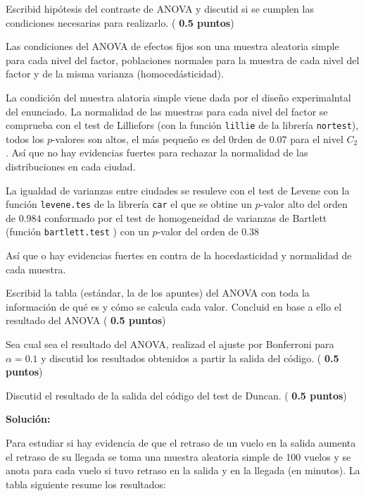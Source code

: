 \documentclass[10pt]{article}\usepackage[]{graphicx}\usepackage[]{color}
\newcounter{problemes}
\newcounter{punts} \def\thepunts{\arabic{punts}}
\def\probl{\addtocounter{problemes}{1} \setcounter{punts}{0}
\medskip\noindent{\bf \theproblemes) }}
\def\punt{\addtocounter{punts}{1} \smallskip{\emph{\thepunts) }}}
\begin{document}
\punt  Escribid hipótesis del contraste de ANOVA y discutid si se cumplen las condiciones necesarias para realizarlo. (\textbf{ 0.5 puntos})


Las condiciones del ANOVA de efectos fijos son una muestra aleatoria simple para cada nivel del factor, poblaciones normales  para la muestra de cada nivel del factor y de la misma varianza (homocedásticidad).

La condición del muestra alatoria simple viene dada por el diseño experimalntal del enunciado. La normalidad de las muestras para cada nivel del factor se comprueba con el test  de Lilliefors (con la función \verb+lillie+ de la librería \verb+nortest+), todos los $p$-valores son altos, el más pequeño es del 0rden de $0.07$ para el nivel $C_2$. Así que no hay evidencias fuertes para rechazar la normalidad de las distribuciones en cada  ciudad.

La igualdad de varianzas entre ciudades se resuleve con el test de Levene con la función \verb+levene.tes+ de la librería \verb+car+ el que se obtine un $p$-valor alto del orden de $0.984$ conformado por el test de homogeneidad de varianzas de Bartlett (función \verb+bartlett.test+ ) con un $p$-valor del orden  de $0.38$

Así que o hay evidencias fuertes en contra de la hocedasticidad y normalidad de cada muestra.


\punt  Escribid la tabla (estándar, la de los apuntes) del ANOVA con toda la información de qué es y cómo se calcula cada valor. Concluid en base a ello el resultado del ANOVA (\textbf{ 0.5 puntos})




\punt  Sea cual sea el resultado del ANOVA, realizad el ajuste por Bonferroni para $\alpha = 0.1$ y discutid los resultados obtenidos a partir la salida del  código. (\textbf{ 0.5 puntos})

\punt Discutid el resultado de la salida del código del test de Duncan. (\textbf{ 0.5 puntos})

\textbf{Solución:}

{\sc












}


\newpage

\probl  Para estudiar si hay evidencia de que el retraso de un vuelo en la salida aumenta el retraso de su llegada se toma una muestra aleatoria simple de 100 vuelos y se anota para cada vuelo si tuvo retraso en la salida y en la llegada (en minutos).
La tabla siguiente resume los resultados:
\end{document}

